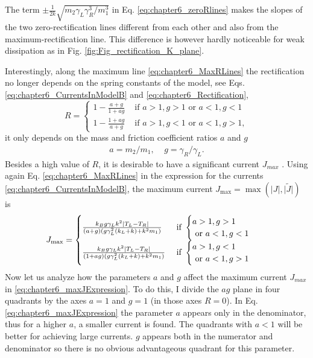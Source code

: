 %
The term $\pm\frac{1}{2k}\sqrt{{m_2\gamma_L\gamma_R^3}/{m_1^3}}$ in Eq. \eqref{eq:chapter6_zeroRlines} makes the slopes of the
two zero-rectification lines different from each other and also from the maximum-rectification line. This difference is however
hardly noticeable for weak dissipation as in  Fig. \ref{fig:Fig_rectification_K_plane}.

Interestingly, along the maximum line  \eqref{eq:chapter6_MaxRLines} the rectification no longer depends on the spring constants of the model,
see  Eqs. \eqref{eq:chapter6_CurrentsInModelB}  and \eqref{eq:chapter6_Rectification},
%
\begin{equation}
    R=
    \begin{cases}
      1-\frac{a+g}{1+ag} &\text{ if }a>1,g>1\text{ or }a<1,g<1\\
      1-\frac{1+ag}{a+g} &\text{ if }a>1,g<1\text{ or }a<1,g>1,
    \end{cases}
  \label{eq:chapter6_maxRExpression}
\end{equation}
%
it only depends on the mass and friction coefficient ratios $a$ and $g$
%
\begin{align}
  a = m_2/m_1,\;\;\;\;
  g = \gamma_R/\gamma_L.
\end{align}
%
Besides a high value of $R$, it is desirable to have a significant current $J_{max}$
\cite{Simon2019}. Using again  Eq. \eqref{eq:chapter6_MaxRLines} in the expression for the currents \eqref{eq:chapter6_CurrentsInModelB}, the maximum current $J_{\max} = \max(\big|{J}\big|,\big|\tilde{J}\big|)$ is
%
\begin{align}
    &J_{\max}=\begin{cases}
   \frac{k_B g\gamma_L k^2 \abs{T_L-T_R}}{(a+g)(g\gamma_L^2(k_L+k)+k^2m_1)} &
   \text{ if }\begin{cases}a>1,g>1\\
   \text{ or }a<1,g<1\end{cases}
    \\
    \frac{k_B g\gamma_L k^2 \abs{T_L-T_R}}{(1+ag)(g\gamma_L^2(k_L+k)+k^2m_1)}&\text{ if }
    \begin{cases}a>1,g<1
    \\\text{ or }a<1,g>1\end{cases}
    \end{cases}
    \label{eq:chapter6_maxJExpression}
\end{align}
%
Now let us analyze how the parameters $a$ and $g$ affect the maximum current $J_{max}$ in \eqref{eq:chapter6_maxJExpression}. To do this, I divide the $ag$ plane in four quadrants by the axes $a = 1$ and $g = 1$ (in those axes $R = 0$). In Eq. \eqref{eq:chapter6_maxJExpression} the parameter $a$ appears only in the denominator, thus for a higher $a$, a smaller current is found. The quadrants with $a < 1$ will be better for achieving large currents. $g$ appears both in the numerator and denominator so there is no obvious advantageous quadrant for this parameter.

